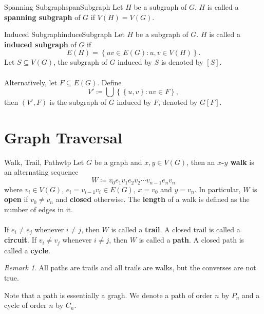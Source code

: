 \documentclass[math]{amznotes}
\theoremstyle{remark}
\newtheorem*{remark}{Remark}
\begin{document}
\begin{dfnbox}{Spanning Subgraph}{spanSubgraph}
    Let $H$ be a subgraph of $G$. $H$ is called a {\color{red} \textbf{spanning subgraph}} of $G$ if $V(H) = V(G)$.
\end{dfnbox}
\begin{dfnbox}{Induced Subgraph}{induceSubgraph}
    Let $H$ be a subgraph of $G$. $H$ is called a {\color{red} \textbf{induced subgraph}} of $G$ if
    \begin{equation*}
        E(H) = \left\{uv \in E(G) \colon u, v \in V(H)\right\}.
    \end{equation*}
    Let $S \subseteq V(G)$, the subgraph of $G$ induced by $S$ is denoted by $[S]$.
    \\\\
    Alternatively, let $F \subseteq E(G)$. Define
    \begin{equation*}
        V' \coloneqq \bigcup \left\{\left\{u, v\right\} \colon uv \in F\right\},
    \end{equation*}
    then $(V', F)$ is the subgraph of $G$ induced by $F$, denoted by $G[F]$.
\end{dfnbox}
\section{Graph Traversal}
\begin{dfnbox}{Walk, Trail, Path}{wtp}
    Let $G$ be a graph and $x, y \in V(G)$, then an {\color{red} \textbf{$x$-$y$ walk}} is an alternating sequence
    \begin{equation*}
        W \coloneqq v_0e_1v_1e_2v_2\cdots v_{n - 1}e_nv_n
    \end{equation*}
    where $v_i \in V(G)$, $e_i = v_{i - 1}v_i \in E(G)$, $x = v_0$ and $y = v_n$. In particular, $W$ is {\color{red} \textbf{open}} if $v_0 \neq v_n$ and {\color{red} \textbf{closed}} otherwise. The {\color{red} \textbf{length}} of a walk is defined as the number of edges in it.
    \\\\
    If $e_i \neq e_j$ whenever $i \neq j$, then $W$ is called a {\color{red} \textbf{trail}}. A closed trail is called a {\color{red} \textbf{circuit}}. If $v_i \neq v_j$ whenever $i \neq j$, then $W$ is called a {\color{red} \textbf{path}}. A closed path is called a {\color{red} \textbf{cycle}}.
\end{dfnbox}
\begin{notebox}
    \begin{remark}
        All paths are trails and all trails are walks, but the converses are not true.
    \end{remark}
\end{notebox}
Note that a path is essentially a gragh. We denote a path of order $n$ by $P_n$ and a cycle of order $n$ by $C_n$.
\end{document}

